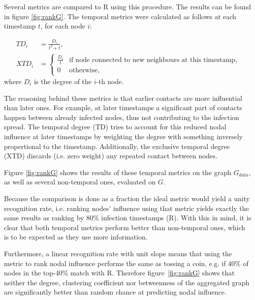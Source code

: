 \documentclass[letterpaper]{article}
\begin{document}
\noindent Several metrics are compared to R using this procedure. The results can be found in figure \ref{fig:rankG}. The temporal metrics were calculated as follows at each timestamp \(t\), for each node \(i\):

\begin{align*}
	TD_i &= \frac{D_i}{t^2+t},\\
	XTD_i &= 
		\begin{cases}
		\frac{D_i}{t}& \text{if node connected to new neighbours at this timestamp,}\\
		0& \text{otherwise},
		\end{cases}
\end{align*}
\noindent where \(D_i\) is the degree of the \(i\)-th node.

The reasoning behind these metrics is that earlier contacts are more influential than later ones. For example, at later timestamps a significant part of contacts happen between already infected nodes, thus not contributing to the infection spread. The temporal degree (TD) tries to account for this reduced nodal influence at later timestamps by weighting the degree with something inversely propertional to the timestamp. 
Additionally, the exclusive temporal degree (XTD) discards (i.e. zero weight) any repeated contact between nodes.

Figure \ref{fig:rankG} shows the results of these temporal metrics on the graph \(G_{data}\), as well as several non-temporal ones, evaluated on \(G\). 

Because the comparison is done as a fraction the ideal metric would yield a unity recognition rate, i.e. ranking nodes' influence using that metric yields exactly the same results as ranking by 80\% infection timestamps (R).
With this in mind, it is clear that both temporal metrics perform better than non-temporal ones, which is to be expected as they use more information.

Furthermore, a linear recognition rate with unit slope means that using the metric to rank nodal influence performs the same as tossing a coin, e.g. if 40\% of nodes in the top-40\% match with R.
Therefore figure~\ref{fig:rankG} shows that neither the degree, clustering coefficient nor betweenness of the aggregated graph are significantly better than random chance at predicting nodal influence.
\end{document}
